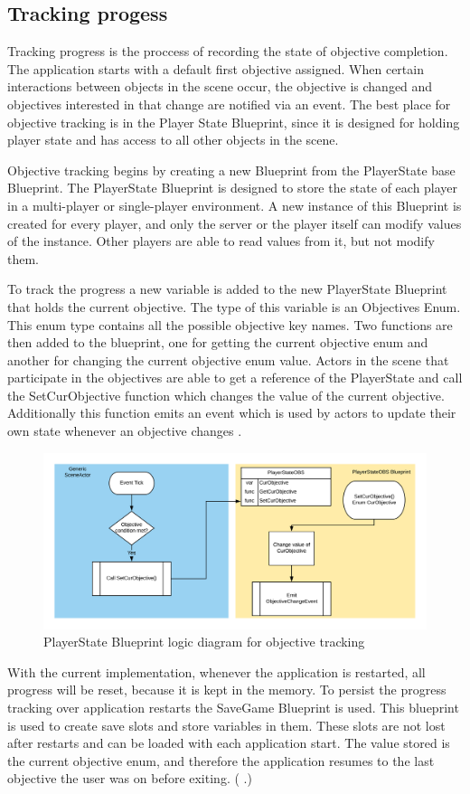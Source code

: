 \documentclass[12pt, a4paper,oneside, nocenter]{thesis}
\newcommand{\citeyeartitlexamk}[1]{(\usebibentry{#1}{title} \citeyear{#1}.)}
\begin{document}
\subsection{Tracking progess}
Tracking progress is the proccess of recording the state of objective completion. The application starts with a default first objective assigned. When certain interactions between objects in the scene occur, the objective is changed and objectives interested in that change are notified via an event. The best place for objective tracking is in the Player State Blueprint, since it is designed for holding player state and has access to all other objects in the scene.
\par
Objective tracking begins by creating a new Blueprint from the PlayerState base Blueprint. The PlayerState Blueprint is designed to store the state of each player in a multi-player or single-player environment. A new instance of this Blueprint is created for every player, and only the server or the player itself can modify values of the instance. Other players are able to read values from it, but not modify them.
\par
To track the progress a new variable is added to the new PlayerState Blueprint that holds the current objective. The type of this variable is an Objectives Enum. This enum type contains all the possible objective key names. Two functions are then added to the blueprint, one for getting the current objective enum and another for changing the current objective enum value. Actors in the scene that participate in the objectives are able to get a reference of the PlayerState and call the SetCurObjective function which changes the value of the current objective. Additionally this function emits an event which is used by actors to update their own state whenever an objective changes .
\begin{figure}[H]
	\includegraphics[width=\textwidth]{player-state}
	\caption{PlayerState Blueprint logic diagram for objective tracking}
	\label{fig:player-state}
\end{figure}
\par
With the current implementation, whenever the application is restarted, all progress will be reset, because it is kept in the memory. To persist the progress tracking over application restarts the SaveGame Blueprint is used. This blueprint is used to create save slots and store variables in them. These slots are not lost after restarts and can be loaded with each application start. The value stored is the current objective enum, and therefore the application resumes to the last objective the user was on before exiting. \citeyeartitlexamk{save-game}
\end{document}
